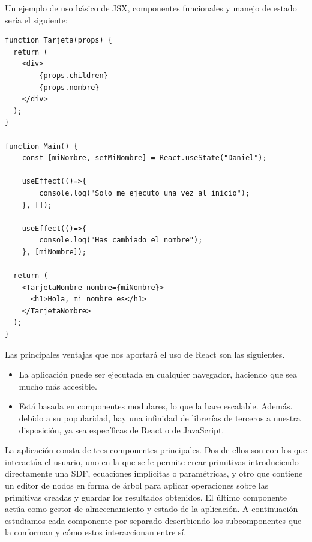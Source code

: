 Un ejemplo de uso básico de JSX, componentes funcionales y manejo de estado sería el siguiente:
\begin{lstlisting}
function Tarjeta(props) {
  return (
    <div>
        {props.children}
        {props.nombre}
    </div>
  );
}

function Main() {
    const [miNombre, setMiNombre] = React.useState("Daniel");

    useEffect(()=>{
        console.log("Solo me ejecuto una vez al inicio");
    }, []);
    
    useEffect(()=>{
        console.log("Has cambiado el nombre");
    }, [miNombre]);
    
  return (
    <TarjetaNombre nombre={miNombre}>
      <h1>Hola, mi nombre es</h1>
    </TarjetaNombre>
  );
}
\end{lstlisting}
Las principales ventajas que nos aportará el uso de React son las siguientes.
\begin{itemize}
    \item La aplicación puede ser ejecutada en cualquier navegador, haciendo que sea mucho más accesible.
    \item Está basada en componentes modulares, lo que la hace escalable. Además. debido a su popularidad, hay una infinidad de librerías de terceros a nuestra disposición, ya sea específicas de React o de JavaScript.
\end{itemize}


La aplicación consta de tres componentes principales. Dos de ellos son con los que interactúa el usuario, uno en la que se le permite crear primitivas introduciendo directamente una SDF, ecuaciones implícitas o paramétricas, y otro que contiene un editor de nodos en forma de árbol para aplicar operaciones sobre las primitivas creadas y guardar los resultados obtenidos. El último componente actúa como gestor de almecenamiento y estado de la aplicación. A continuación estudiamos cada componente por separado describiendo los subcomponentes que la conforman y cómo estos interaccionan entre sí.

